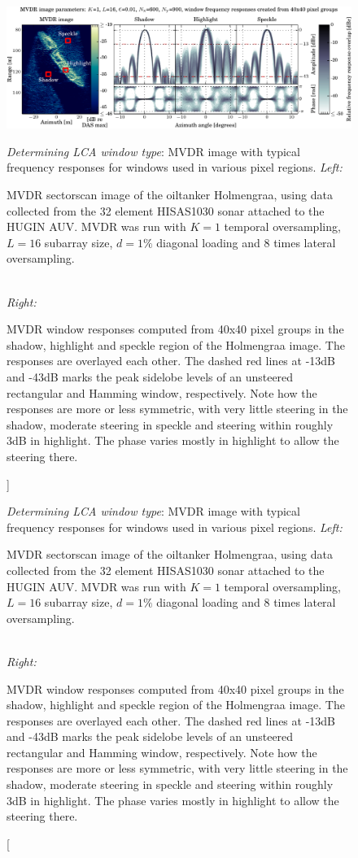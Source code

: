 \documentclass[10pt,journal,draftclsnofoot,onecolumn]{IEEEtran}
\let\MYoriglatexcaption\caption               %
\renewcommand{\caption}[2][\relax]{\MYoriglatexcaption[#2]{#2}}
\newcommand\1{\vec 1}
\begin{document}
\begin{figure}[t]\centering%
\includegraphics[width=\linewidth]{gfx/mvdr_selected_windows_holmengraa.pdf}%
\caption{\emph{Determining LCA window type}: MVDR image with typical frequency responses for windows used in various pixel regions.\newline
\emph{Left:}\hfill
\parbox[t]{.95\linewidth}{MVDR sectorscan image of the oiltanker Holmengraa, using data collected from the 32 element HISAS1030 sonar attached to the HUGIN AUV. MVDR was run with $K=1$ temporal oversampling, $L=16$ subarray size, $d=1\%$ diagonal loading and 8 times lateral oversampling.}\protect\\\hspace{\textwidth}
\emph{Right:}\hfill
\parbox[t]{.95\linewidth}{MVDR window responses computed from 40x40 pixel groups in the shadow, highlight and speckle region of the Holmengraa image. The responses are overlayed each other. The dashed red lines at -13dB and -43dB marks the peak sidelobe levels of an unsteered rectangular and Hamming window, respectively. Note how the responses are more or less symmetric, with very little steering in the shadow, moderate steering in speckle and steering within roughly 3dB in highlight. The phase varies mostly in highlight to allow the steering there.} }\label{mvdr_selected_windows}
\end{figure}

\end{document}
